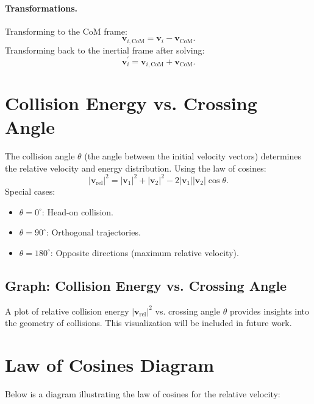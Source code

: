 \documentclass[12pt]{article}
\begin{document}
\paragraph{Transformations.} Transforming to the CoM frame:
\begin{equation}
    \mathbf{v}_{i, \text{CoM}} = \mathbf{v}_{i} - \mathbf{v}_{\text{CoM}}.
\end{equation}
Transforming back to the inertial frame after solving:
\begin{equation}
    \mathbf{v}_{i}^{\prime} = \mathbf{v}_{i, \text{CoM}} + \mathbf{v}_{\text{CoM}}.
\end{equation}

\section{Collision Energy vs. Crossing Angle}
The collision angle $\theta$ (the angle between the initial velocity vectors) determines the relative velocity and energy distribution. Using the law of cosines:
\begin{equation}
    |\mathbf{v}_{\text{rel}}|^2 = |\mathbf{v}_{1}|^2 + |\mathbf{v}_{2}|^2 - 2|\mathbf{v}_{1}||\mathbf{v}_{2}|\cos\theta.
\end{equation}
Special cases:
\begin{itemize}
    \item $\theta = 0^\circ$: Head-on collision.
    \item $\theta = 90^\circ$: Orthogonal trajectories.
    \item $\theta = 180^\circ$: Opposite directions (maximum relative velocity).
\end{itemize}

\subsection{Graph: Collision Energy vs. Crossing Angle}
A plot of relative collision energy $|\mathbf{v}_{\text{rel}}|^2$ vs. crossing angle $\theta$ provides insights into the geometry of collisions. This visualization will be included in future work.

\section{Law of Cosines Diagram}
Below is a diagram illustrating the law of cosines for the relative velocity:

\begin{center}
\end{center}
\end{document}
